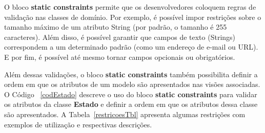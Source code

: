\vspace{0.5cm}

\noindent  O  bloco {\bf  static  constraints}  permite  que os  desenvolvedores
coloquem regras  de validação nas classes  de domínio.  Por  exemplo, é possível
impor restrições  sobre o tamanho  máximo de um  atributo String (por  padrão, o
tamanho é 255 caracteres).  Além disso,  é possível garantir que campos de texto
(Strings) correspondem  a um determinado padrão  (como um endereço  de e-mail ou
URL). E por fim, é possível até mesmo tornar campos opcionais ou obrigatórios.

Além  dessas validações,  o bloco  {\bf static  constraints}  também possibilita
definir a  ordem em que  os atributos de  um modelo são apresentados  nas visões
associadas.   O Código  ~\ref{codEstado} descreve  o  uso do  bloco {\bf  static
  constraints}  para validar os  atributos da  classe {\bf  Estado} e  definir a
ordem   em    que   os   atributos    dessa   classe   são    apresentados.    A
Tabela~\ref{restricoesTbl}   apresenta  algumas   restrições  com   exemplos  de
utilização e respectivas descrições.

